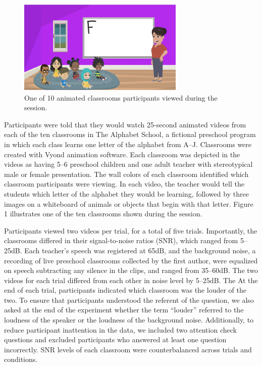 \documentclass[10pt, letterpaper]{article}
\newenvironment{CodeChunk}{}{}
\begin{document}
\begin{CodeChunk}
\begin{figure}[t]

{\centering \includegraphics{figs/e1-stimuli-1} 

}

\caption[One of 10 animated classrooms participants viewed during the session]{One of 10 animated classrooms participants viewed during the session.}\label{fig:e1-stimuli}
\end{figure}
\end{CodeChunk}

Participants were told that they would watch 25-second animated videos
from each of the ten classrooms in The Alphabet School, a fictional
preschool program in which each class learns one letter of the alphabet
from A--J. Classrooms were created with Vyond animation software. Each
classroom was depicted in the videos as having 5--6 preschool children
and one adult teacher with stereotypical male or female presentation.
The wall colors of each classroom identified which classroom
participants were viewing. In each video, the teacher would tell the
students which letter of the alphabet they would be learning, followed
by three images on a whiteboard of animals or objects that begin with
that letter. Figure 1 illustrates one of the ten classrooms shown during
the session.

Participants viewed two videos per trial, for a total of five trials.
Importantly, the classrooms differed in their signal-to-noise ratios
(SNR), which ranged from 5--25dB. Each teacher's speech was registered
at 65dB, and the background noise, a recording of live preschool
classrooms collected by the first author, were equalized on speech
subtracting any silence in the clips, and ranged from 35--60dB. The two
videos for each trial differed from each other in noise level by
5--25dB. The At the end of each trial, participants indicated which
classroom was the louder of the two. To ensure that participants
understood the referent of the question, we also asked at the end of the
experiment whether the term ``louder'' referred to the loudness of the
speaker or the loudness of the background noise. Additionally, to reduce
participant inattention in the data, we included two attention check
questions and excluded participants who answered at least one question
incorrectly. SNR levels of each classroom were counterbalanced across
trials and conditions.
\end{document}
